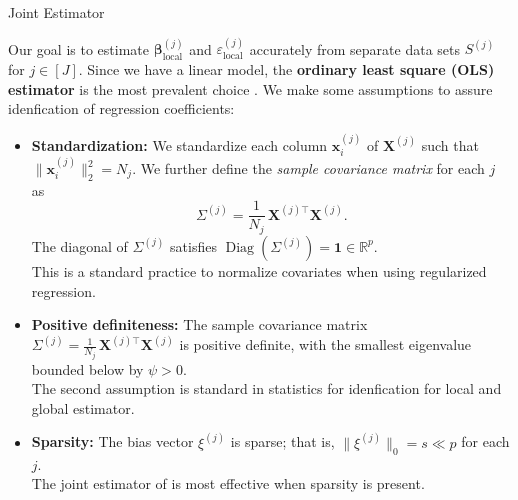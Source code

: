 \documentclass{beamer}
\newcommand{\mb}[1]{{\mathbf{#1}}}
\newcommand{\txrd}[1]{{\textcolor{sintefred}{\textbf{#1}}}}
\begin{document}
\begin{frame}{Joint Estimator}

Our goal is to estimate $ {\bm \beta}^{(j)}_{\text{local}}$ and $\varepsilon_{\text{local}}^{(j)}$ accurately from separate data sets $S^{(j)}$ for $j \in [J]$. Since we have a linear model, the \txrd{ordinary least square (OLS) estimator} is the most prevalent choice \citet{bastani2021predicting}. We make some assumptions to assure idenfication of regression coefficients:
\begin{itemize}
    \item \txrd{Standardization:}
    We standardize each column $\bm x_i^{(j)}$ of $\mb X^{(j)}$ such that
    $\|\bm x_i^{(j)}\|_2^2 = N_j$.
    We further define the \textit{sample covariance matrix} for each $j$ as
    \[
        \Sigma^{(j)} = \frac{1}{N_j}\, \mb X^{(j)\top} \mb X^{(j)} .
    \]
    The diagonal of $\Sigma^{(j)}$ satisfies
    $\operatorname{Diag}(\Sigma^{(j)}) = \bm 1 \in \mathbb{R}^p$. \\ This is a standard practice to normalize covariates when using regularized regression.

    \item \txrd{Positive definiteness:}
    The sample covariance matrix
    \(
        \Sigma^{(j)} = \frac{1}{N_j}\, \mb X^{(j)\top} \mb X^{(j)}
    \)
    is positive definite, with the smallest eigenvalue bounded below by
    $\psi > 0$. \\ The second assumption is standard in statistics for idenfication for local and global estimator.

    \item \txrd{Sparsity:}
    The bias vector $\xi^{(j)}$ is sparse; that is,
    $\|\xi^{(j)}\|_0 = s \ll p$ for each $j$. \\ The joint estimator of \citet{bastani2021predicting} is most effective when sparsity is present.
\end{itemize}

\end{frame}

\end{document}
